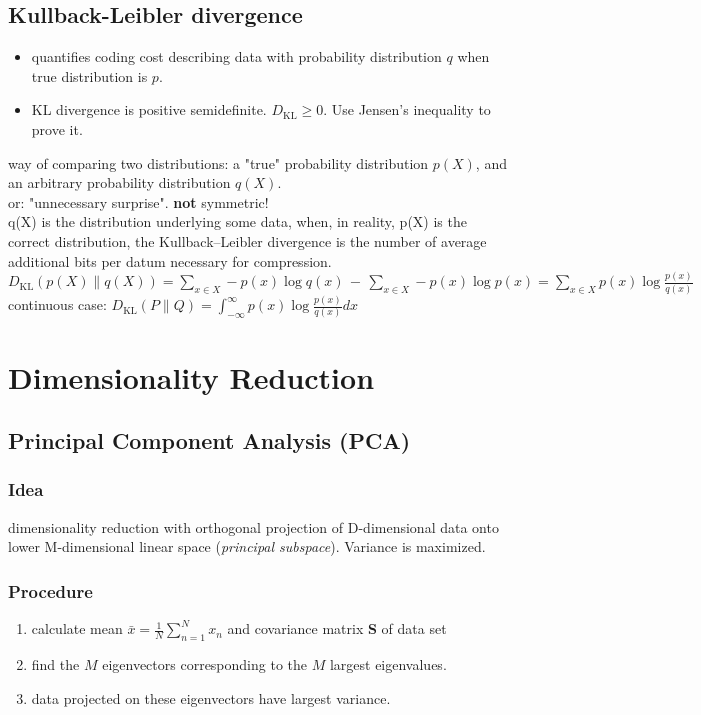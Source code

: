 \documentclass[9pt,parskip]{scrartcl}
\begin{document}
\begin{multicols*}{4}
\subsection*{Kullback-Leibler divergence}
\begin{itemize}
	\item quantifies coding cost describing data with probability distribution $q$ when true distribution is $p$.
	\item KL divergence is positive semidefinite. $D_{\mathrm {KL} } \geq 0$. Use Jensen's inequality to prove it. 
\end{itemize}
way of comparing two distributions: a "true" probability distribution $p(X)$, and an arbitrary probability distribution $q(X)$. \\
or: "unnecessary surprise". \textbf{not} symmetric! \\
q(X) is the distribution underlying some data, when, in reality, p(X) is the correct distribution, the Kullback–Leibler divergence is the number of average additional bits per datum necessary for compression. \\
$D_{\mathrm {KL} }(p(X)\|q(X))=\sum _{x\in X}-p(x)\log {q(x)}\,-\,\sum _{x\in X}-p(x)\log {p(x)}=\sum _{x\in X}p(x)\log {\frac {p(x)}{q(x)}}$ \\
continuous case: $D_{\mathrm {KL} }(P\|Q)=\int _{-\infty }^{\infty }p(x) \log {\frac {p(x)}{q(x)}} dx$ \\



\section*{Dimensionality Reduction}
\subsection*{Principal Component Analysis (PCA)}
\subsubsection*{Idea}
dimensionality reduction with orthogonal projection of D-dimensional data onto lower M-dimensional linear space (\textit{principal subspace}). Variance is maximized.
\subsubsection*{Procedure}
\begin{enumerate}
	\item calculate mean $\bar{x} = \frac 1 N \sum_{n=1}^{N}x_n$ and covariance matrix \textbf{S} of data set
	\item find the $M$ eigenvectors corresponding to the $M$ largest eigenvalues.
	\item data projected on these eigenvectors have largest variance.
\end{enumerate}

\end{multicols*}
\end{document}
